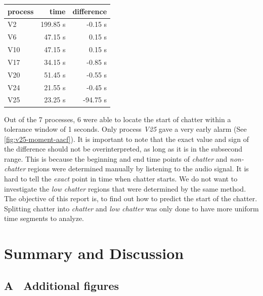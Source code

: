 \documentclass[12 pt]{scrartcl}
\begin{document}
\begin{table}[ht]
  \centering
  \label{tab:aacfstats}
  \begin{tabular}{l|rr}
    \\
    process & time     & difference \\
    \hline
    V2      & 199.85 s & -0.15 s    \\
    V6      & 47.15 s  & 0.15 s     \\
    V10     & 47.15 s  & 0.15 s     \\
    V17     & 34.15 s  & -0.85 s    \\
    V20     & 51.45 s  & -0.55 s    \\
    V24     & 21.55 s  & -0.45 s    \\
    V25     & 23.25 s  & -94.75 s   \\
  \end{tabular}
\end{table}

Out of the 7 processes, 6 were able to locate the start of chatter within a tolerance window of 1 seconds. Only process \emph{V25} gave a very early alarm (See \ref{fig:v25-moment-aacf}).
It is important to note that the exact value and sign of the difference should not be overinterpreted, as long as it is in the subsecond range. This is because the beginning and end time points of \emph{chatter} and \emph{non-chatter} regions were determined manually by listening to the audio signal. It is hard to tell the \emph{exact} point in time when chatter starts.
We do not want to investigate the \emph{low chatter} regions that were determined by the same method. The objective of this report is, to find out how to predict the start of the chatter. Splitting chatter into \emph{chatter} and \emph{low chatter} was only done to have more uniform time segments to analyze.

\section{Summary and Discussion}


\newpage
{}
\renewcommand\refname{Bibliography}


\newpage
\appendix
{}
\subsection*{A \ Additional figures}
\end{document}
